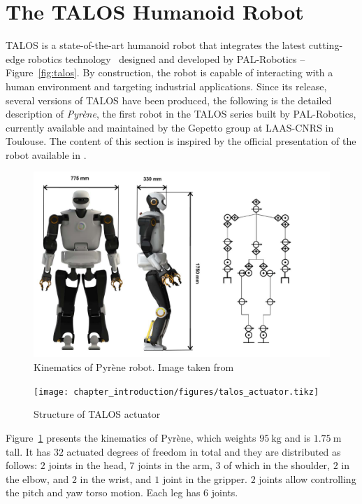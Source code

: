 \section{The TALOS Humanoid Robot\label{sec:talos}}
TALOS is a state-of-the-art humanoid robot that integrates the latest cutting-edge robotics technology~\citep{Stasse2017TALOS:Applications} designed and developed by PAL-Robotics -- Figure~\ref{fig:talos}.
By construction, the robot is capable of interacting with a human environment and targeting industrial applications. 
Since its release, several versions of TALOS have been produced, the following is the detailed description of \emph{Pyr\`{e}ne}, the first robot in the TALOS series built by PAL-Robotics, currently available and maintained by the Gepetto group at LAAS-CNRS in Toulouse. The content of this section is inspired by the official presentation of the robot available in \cite{Stasse2017TALOS:Applications}.
\begin{figure}[tpb]
\centering
    \includegraphics[width=\textwidth]{chapter_introduction/figures/talos_kinematics.png}
    \caption[Kinematics of Pyr\`{e}ne robot]{Kinematics of Pyr\`{e}ne robot. Image taken from~\citep{Stasse2017TALOS:Applications}    \label{fig:talos_kinematics}}
\end{figure}
\begin{figure}[tpb]
\centering
    \texttt{[image: chapter\_introduction/figures/talos\_actuator.tikz]}
    \caption{Structure of TALOS actuator \label{fig:talos_actuator}}
\end{figure}
\par
Figure~\ref{fig:talos_kinematics} presents the kinematics of Pyr\`{e}ne, which weights $\SI{95}{\kilo \gram}$ and is $\SI{1.75}{\meter}$ tall. It has $32$ actuated degrees of freedom in total and they are distributed as follows: $2$ joints in the head, $7$ joints in the arm, $3$ of which in the shoulder, $2$ in the elbow, and $2$ in the wrist, and $1$ joint in the gripper. $2$ joints allow controlling the pitch and yaw torso motion. Each leg has $6$ joints.
